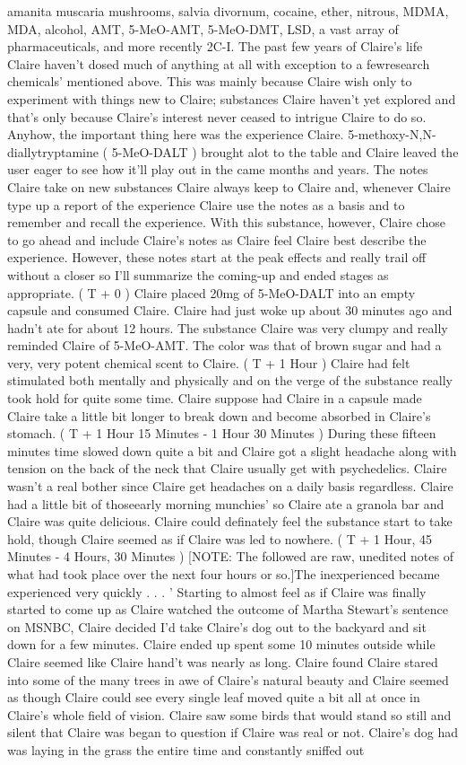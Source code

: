 \documentclass[12pt]{book}
\begin{document}
amanita muscaria mushrooms, salvia divornum, cocaine, ether, nitrous, MDMA, MDA, alcohol, AMT, 5-MeO-AMT, 5-MeO-DMT, LSD, a vast array of pharmaceuticals, and more recently 2C-I. The past few years of Claire's life Claire haven't dosed much of anything at all with exception to a fewresearch chemicals' mentioned above. This was mainly because Claire wish only to experiment with things new to Claire; substances Claire haven't yet explored and that's only because Claire's interest never ceased to intrigue Claire to do so. Anyhow, the important thing here was the experience Claire. 5-methoxy-N,N-diallytryptamine ( 5-MeO-DALT ) brought alot to the table and Claire leaved the user eager to see how it'll play out in the came months and years. The notes Claire take on new substances Claire always keep to Claire and, whenever Claire type up a report of the experience Claire use the notes as a basis and to remember and recall the experience. With this substance, however, Claire chose to go ahead and include Claire's notes as Claire feel Claire best describe the experience. However, these notes start at the peak effects and really trail off without a closer so I'll summarize the coming-up and ended stages as appropriate. ( T + 0 ) Claire placed 20mg of 5-MeO-DALT into an empty capsule and consumed Claire. Claire had just woke up about 30 minutes ago and hadn't ate for about 12 hours. The substance Claire was very clumpy and really reminded Claire of 5-MeO-AMT. The color was that of brown sugar and had a very, very potent chemical scent to Claire. ( T + 1 Hour ) Claire had felt stimulated both mentally and physically and on the verge of the substance really took hold for quite some time. Claire suppose had Claire in a capsule made Claire take a little bit longer to break down and become absorbed in Claire's stomach. ( T + 1 Hour 15 Minutes - 1 Hour 30 Minutes ) During these fifteen minutes time slowed down quite a bit and Claire got a slight headache along with tension on the back of the neck that Claire usually get with psychedelics. Claire wasn't a real bother since Claire get headaches on a daily basis regardless. Claire had a little bit of thoseearly morning munchies' so Claire ate a granola bar and Claire was quite delicious. Claire could definately feel the substance start to take hold, though Claire seemed as if Claire was led to nowhere. ( T + 1 Hour, 45 Minutes - 4 Hours, 30 Minutes ) [NOTE: The followed are raw, unedited notes of what had took place over the next four hours or so.]The inexperienced became experienced very quickly . . .  ' Starting to almost feel as if Claire was finally started to come up as Claire watched the outcome of Martha Stewart's sentence on MSNBC, Claire decided I'd take Claire's dog out to the backyard and sit down for a few minutes. Claire ended up spent some 10 minutes outside while Claire seemed like Claire hand't was nearly as long. Claire found Claire stared into some of the many trees in awe of Claire's natural beauty and Claire seemed as though Claire could see every single leaf moved quite a bit all at once in Claire's whole field of vision. Claire saw some birds that would stand so still and silent that Claire was began to question if Claire was real or not. Claire's dog had was laying in the grass the entire time and constantly sniffed out 
\end{document}
